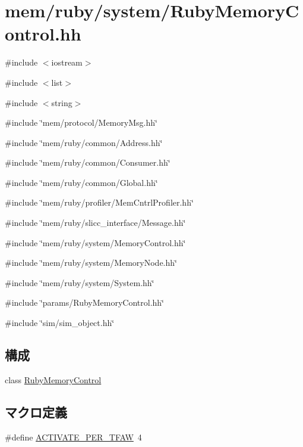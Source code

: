 \hypertarget{RubyMemoryControl_8hh}{
\section{mem/ruby/system/RubyMemoryControl.hh}
\label{RubyMemoryControl_8hh}
}
{\ttfamily \#include $<$iostream$>$}\par
{\ttfamily \#include $<$list$>$}\par
{\ttfamily \#include $<$string$>$}\par
{\ttfamily \#include \char`\"{}mem/protocol/MemoryMsg.hh\char`\"{}}\par
{\ttfamily \#include \char`\"{}mem/ruby/common/Address.hh\char`\"{}}\par
{\ttfamily \#include \char`\"{}mem/ruby/common/Consumer.hh\char`\"{}}\par
{\ttfamily \#include \char`\"{}mem/ruby/common/Global.hh\char`\"{}}\par
{\ttfamily \#include \char`\"{}mem/ruby/profiler/MemCntrlProfiler.hh\char`\"{}}\par
{\ttfamily \#include \char`\"{}mem/ruby/slicc\_\-interface/Message.hh\char`\"{}}\par
{\ttfamily \#include \char`\"{}mem/ruby/system/MemoryControl.hh\char`\"{}}\par
{\ttfamily \#include \char`\"{}mem/ruby/system/MemoryNode.hh\char`\"{}}\par
{\ttfamily \#include \char`\"{}mem/ruby/system/System.hh\char`\"{}}\par
{\ttfamily \#include \char`\"{}params/RubyMemoryControl.hh\char`\"{}}\par
{\ttfamily \#include \char`\"{}sim/sim\_\-object.hh\char`\"{}}\par
\subsection*{構成}
\begin{DoxyCompactItemize}
\item 
class \hyperlink{classRubyMemoryControl}{RubyMemoryControl}
\end{DoxyCompactItemize}
\subsection*{マクロ定義}
\begin{DoxyCompactItemize}
\item 
\#define \hyperlink{RubyMemoryControl_8hh_a783700b32287aaa8e56e1b63a611a927}{ACTIVATE\_\-PER\_\-TFAW}~4
\end{DoxyCompactItemize}
